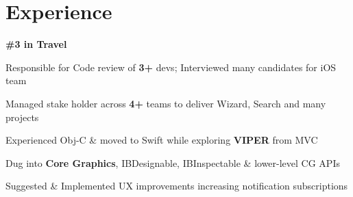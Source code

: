 \documentclass[]{Kauts}
\begin{document}
\begin{minipage}[t]{0.69\textwidth} 


\section{Experience}
 \hfill \textbf{\#3 in Travel}\\
\vspace{\topsep}
\begin{tightemize}
\item Responsible for Code review of \textbf{3+} devs; Interviewed many candidates for iOS team\\
\item Managed stake holder across \textbf{4+} teams to deliver Wizard, Search and many projects\\
\item Experienced Obj-C \& moved to Swift while exploring \textbf{VIPER} from MVC\\
\item Dug into \textbf{Core Graphics}, IBDesignable, IBInspectable \& lower-level CG APIs\\
\item Suggested \& Implemented UX improvements increasing notification subscriptions\\
\end{tightemize}
\sectionsep


\end{minipage}
\end{document}
